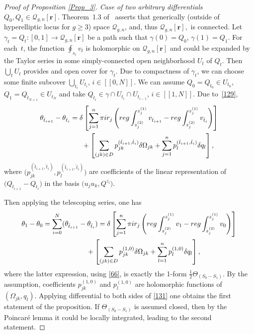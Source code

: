 \documentclass[10pt,a4paper]{article}
\numberwithin{equation}{section}
\theoremstyle{definition}
\begin{document}
\begin{proof}[Proof of Proposition \ref{Prop_3}]
\textit{Case of two arbitrary differentials} $Q_0, Q_1 \in \mathcal{Q}_{g,n}[\mathbf{r}] $.
Theorem~1.3 of~\cite{chen2021classification} asserts that generically (outside of hyperelliptic locus for $g \geq 3$) space $\mathcal{Q}_{g,n}$, and, thus $\mathcal{Q}_{g,n}[\mathbf{r}],$ is connected. Let $\gamma_t=Q_t\colon [0,1] \xrightarrow{} \mathcal{Q}_{g,n}[\mathbf{r}] $ be a path such that $\gamma(0)=Q_0$, $\gamma(1)=Q_1.$ For each~$t$, the function $\oint_{s_i} v_t$ is holomorphic on $\mathcal{Q}_{g,n}[\mathbf{r}]$ and could be expanded by the Taylor series in some simply-connected open neighborhood $U_t$ of $Q_t$. Then $\bigcup_t U_t$ provides and open cover for $\gamma_t$. Due to compactness of $\gamma_t$, we can choose some finite subcover $\bigcup_{t_i} U_{t_i}$, $i \in [[0,N]].$ We can assume $Q_0=Q_{\hat{t}_0} \in U_{t_0}$, $Q_1=Q_{\hat{t}_{N+1}} \in U_{t_N}$ and take $Q_{\hat{t}_i} \in \gamma \cap U_{t_{i}} \cap U_{t_{i-1}}$, $i \in [[1,N]]$.
Due to~\eqref{129},
\begin{gather*}%
\theta_{\hat{t}_{i+1}}-\theta_{\hat{t}_i}= \delta \left[\sum^n_{j=1} \pi {\rm i} r_j \left({\rm reg}\int^{z^{(1)}_j}_{z^{(2)}_j}{v_{\hat{t}_{i+1}}}-{\rm reg}\int^{z^{(1)}_j}_{z^{(2)}_j}{v_{\hat{t}_i}} \right) \right]\\
\hphantom{\theta_{\hat{t}_{i+1}}-\theta_{\hat{t}_i}=}{}
+\left[\sum_{(jk) \in D}p^{(\hat{t}_{i+1}, \hat{t}_i)}_{jk} \delta \Omega_{jk}+\sum^n_{j=1}p^{(\hat{t}_{i+1}, \hat{t}_i)}_l \delta q_l \right],
\end{gather*}
where $\big(p^{(\hat{t}_{i+1}, \hat{t}_i)}_{jk}, p^{(\hat{t}_{i+1}, \hat{t}_i)}_l\big)$ are coefficients of the linear representation of $\big(Q_{\hat{t}_{i+1}}-Q_{\hat{t}_{i}}\big)$ in the basis $\big(u_j u_k, Q^{z_l}\big)$.

Then applying the telescoping series, one has
\begin{gather}\theta_{1}-\theta_{0}=\sum^{N}_{i=0}(\theta_{\hat{t}_{i+1}}-\theta_{\hat{t}_i})= \delta \left[\sum^n_{j=1} \pi{\rm i} r_j \left({\rm reg}\int^{z^{(1)}_j}_{z^{(2)}_j}v_1-{\rm reg}\int^{z^{(1)}_j}_{z^{(2)}_j} v_0 \right) \right]\nonumber\\
\hphantom{\theta_{1}-\theta_{0}=}{}
+\left[\sum_{(jk) \in D}p^{(1,0)}_{jk} \delta \Omega_{jk}+\sum^n_{l=1}p^{(1,0)}_l \delta q_l\right],\label{131}
\end{gather}
where the latter expression, using \eqref{66}, is exactly the 1-form $\frac{1}{2}\Theta_{(S_0-S_1)}.$ By the assumption, coefficients $p^{(1,0)}_{jk}$ and $p^{(1,0)}_l$ are holomorphic functions of $(\Omega_{jk},q_l)$.
Applying differential to both sides of \eqref{131} one obtains the first statement of the proposition. If $\Theta_{(S_0 -S_1)}$ is assumed closed, then by the Poincar\'e lemma it could be locally integrated, leading to the second statement.
\end{proof}
\end{document}
